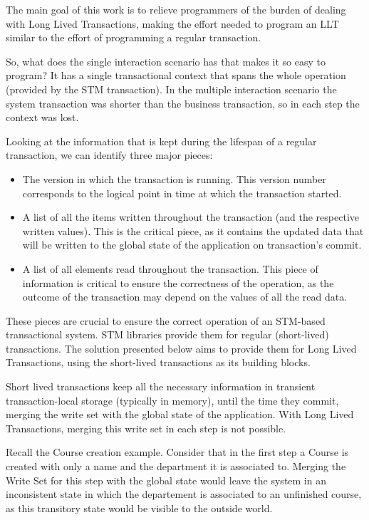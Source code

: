 \documentclass{llncs}
\begin{document}
The main goal of this work is to relieve programmers of the burden of
dealing with Long Lived Transactions, making the effort needed to
program an LLT similar to the effort of programming a regular
transaction.

So, what does the single interaction scenario has that makes it so
easy to program? It has a single transactional context that spans the
whole operation (provided by the STM transaction). In the multiple
interaction scenario the system transaction was shorter than the
business transaction, so in each step the context was lost.

Looking at the information that is kept during the lifespan of a
regular transaction, we can identify three major pieces:

\begin{itemize}
\item The version in which the transaction is running. This version
  number corresponds to the logical point in time at which the
  transaction started.
\item A list of all the items written throughout the transaction (and
  the respective written values). This is the critical piece, as it
  contains the updated data that will be written to the global state
  of the application on transaction's commit.
\item A list of all elements read throughout the transaction. This
  piece of information is critical to ensure the correctness of the
  operation, as the outcome of the transaction may depend on the
  values of all the read data.
\end{itemize}

These pieces are crucial to ensure the correct operation of an
STM-based transactional system. STM libraries provide them for regular
(short-lived) transactions. The solution presented below aims to
provide them for Long Lived Transactions, using the short-lived
transactions as its building blocks.

Short lived transactions keep all the necessary information in
transient transaction-local storage (typically in memory), until the
time they commit, merging the write set with the global state of the
application. With Long Lived Transactions, merging this write set in
each step is not possible.

Recall the Course creation example. Consider that in the first step a
Course is created with only a name and the department it is associated
to. Merging the Write Set for this step with the global state would
leave the system in an inconsistent state in which the departement is
associated to an unfinished course, as this transitory state would be
visible to the outside world.
\end{document}
